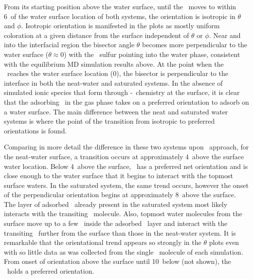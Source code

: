 \documentclass{article}
\begin{document}
	From its starting position above the water surface, until the \suldiox~moves to within 6\angs~of the water surface location of both systems, the orientation is isotropic in $\theta$ and $\phi$. Isotropic orientation is manifested in the plots as mostly uniform coloration at a given distance from the surface independent of $\theta$ or $\phi$. Near and into the interfacial region the bisector angle $\theta$ becomes more perpendicular to the water surface ($\theta \approx 0$\textdegree) with the \suldiox~sulfur pointing into the water phase, consistent with the equilibrium MD simulation results above. At the point when the \suldiox~reaches the water surface location (0\angs), the bisector is perpendicular to the interface in both the neat-water and saturated systems. %
	In the absence of simulated ionic species that form through \suldiox-\wat~chemistry at the surface, it is clear that the adsorbing \suldiox~in the gas phase takes on a preferred orientation to adsorb on a water surface. The main difference between the neat and saturated water systems is where the point of the transition from isotropic to preferred orientations is found. 
 
  Comparing in more detail the difference in these two systems upon \suldiox~approach, for the neat-water surface, a transition occurs at approximately 4\angs~above the surface water location. Below 4\angs~above the surface, \suldiox~has a preferred net orientation and is close enough to the water surface that it begins to interact with the topmost surface waters. In the saturated system, the same trend occurs, however the onset of the perpendicular orientation begins at approximately 8\angs~above the surface. The layer of adsorbed \suldiox~already present in the saturated system most likely interacts with the transiting \suldiox~molecule. Also, topmost water molecules from the surface move up to a few \angs~inside the adsorbed \suldiox~layer and interact with the transiting \suldiox~further from the surface than those in the neat-water system. It is remarkable that the orientational trend appears so strongly in the $\theta$ plots even with so little data as was collected from the single \suldiox~molecule of each simulation. From onset of orientation above the surface until 10\angs~below (not shown), the \suldiox~holds a preferred orientation.

\end{document}
